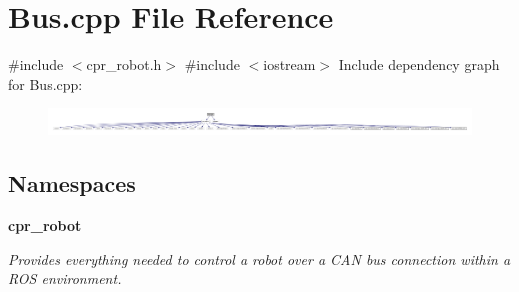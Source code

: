 \section{Bus.\+cpp File Reference}
\label{Bus_8cpp}
{\ttfamily \#include $<$cpr\+\_\+robot.\+h$>$}\newline
{\ttfamily \#include $<$iostream$>$}\newline
Include dependency graph for Bus.\+cpp\+:
\nopagebreak
\begin{figure}[H]
\begin{center}
\leavevmode
\includegraphics[width=350pt]{Bus_8cpp__incl}
\end{center}
\end{figure}
\subsection*{Namespaces}
\begin{DoxyCompactItemize}
\item 
 \textbf{ cpr\+\_\+robot}
\begin{DoxyCompactList}\small\item\em Provides everything needed to control a robot over a C\+AN bus connection within a R\+OS environment. \end{DoxyCompactList}\end{DoxyCompactItemize}
